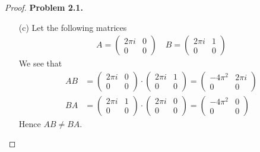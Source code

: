 \documentclass[11pt]{article}
\theoremstyle{definition}
\begin{document}
\begin{proof}{\textbf{Problem 2.1.}}
\begin{itemize}
    \item [(c)] Let the following matrices
    \begin{align*}
        A = \begin{pmatrix} 2\pi i & 0\\ 0 & 0 \end{pmatrix}
        \quad
        B = \begin{pmatrix} 2\pi i & 1\\ 0 & 0 \end{pmatrix}
    \end{align*}
    We see that 
    \begin{align*}
        AB &= \begin{pmatrix} 2\pi i & 0\\ 0 & 0 \end{pmatrix}
        \cdot \begin{pmatrix} 2\pi i & 1\\ 0 & 0 \end{pmatrix}
        = \begin{pmatrix} -4\pi^2 & 2\pi i\\ 0 & 0 \end{pmatrix}\\
        BA &= \begin{pmatrix} 2\pi i & 1\\ 0 & 0 \end{pmatrix}
        \cdot \begin{pmatrix} 2\pi i & 0\\ 0 & 0 \end{pmatrix}
        = \begin{pmatrix} -4\pi^2 &  0\\ 0 & 0 \end{pmatrix}
    \end{align*}
    Hence $AB \neq BA$.


\end{itemize}
\end{proof}
\end{document}
